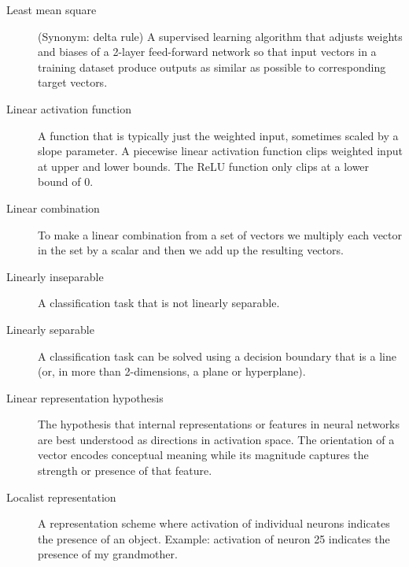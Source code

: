 \begin{description}
\item[Least mean square] (Synonym: delta rule) A supervised learning algorithm that adjusts weights and biases of a 2-layer feed-forward network so that input vectors in a training dataset produce outputs as similar as possible to corresponding target vectors.

\item[Linear activation function] A function that is typically just the weighted input, sometimes scaled by a slope parameter. A piecewise linear activation function clips weighted input at  upper and lower bounds. The ReLU function only clips at a lower bound of 0.

\item[Linear combination] To make a linear combination from a set of vectors we multiply each vector in the set by a scalar and then we add up the resulting vectors.



\item[Linearly inseparable] A classification task that is not linearly separable.

\item[Linearly separable] A classification task can be solved using a decision boundary that is a line (or, in more than 2-dimensions, a plane or hyperplane).

\item[Linear representation hypothesis] The hypothesis that internal representations or features in neural networks are best understood as directions in activation space. The orientation of a vector encodes conceptual meaning while its magnitude captures the strength or presence of that feature.

\item[Localist representation] A representation scheme where activation of individual neurons indicates the presence of an object. Example: activation of neuron 25 indicates the presence of my grandmother.



\end{description}
